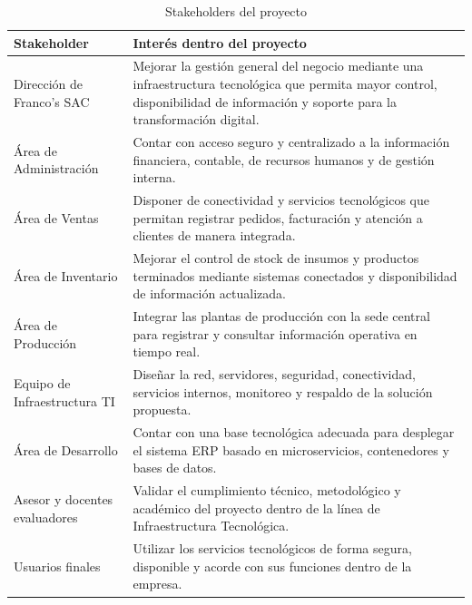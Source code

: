 \documentclass[11pt, a4paper, oneside]{report}
\begin{document}
\begin{table}[htbp]
\centering
\caption{Stakeholders del proyecto}
\small
\renewcommand{\arraystretch}{1.25}
\begin{tabularx}{\textwidth}{|L{3.5cm}|X|}
\hline
{}
\textbf{Stakeholder} & \textbf{Interés dentro del proyecto} \\
\hline
Dirección de Franco's SAC & Mejorar la gestión general del negocio mediante una infraestructura tecnológica que permita mayor control, disponibilidad de información y soporte para la transformación digital. \\
\hline
Área de Administración & Contar con acceso seguro y centralizado a la información financiera, contable, de recursos humanos y de gestión interna. \\
\hline
Área de Ventas & Disponer de conectividad y servicios tecnológicos que permitan registrar pedidos, facturación y atención a clientes de manera integrada. \\
\hline
Área de Inventario & Mejorar el control de stock de insumos y productos terminados mediante sistemas conectados y disponibilidad de información actualizada. \\
\hline
Área de Producción & Integrar las plantas de producción con la sede central para registrar y consultar información operativa en tiempo real. \\
\hline
Equipo de Infraestructura TI & Diseñar la red, servidores, seguridad, conectividad, servicios internos, monitoreo y respaldo de la solución propuesta. \\
\hline
Área de Desarrollo & Contar con una base tecnológica adecuada para desplegar el sistema ERP basado en microservicios, contenedores y bases de datos. \\
\hline
Asesor y docentes evaluadores & Validar el cumplimiento técnico, metodológico y académico del proyecto dentro de la línea de Infraestructura Tecnológica. \\
\hline
Usuarios finales & Utilizar los servicios tecnológicos de forma segura, disponible y acorde con sus funciones dentro de la empresa. \\
\hline
\end{tabularx}
\end{table}
\end{document}
